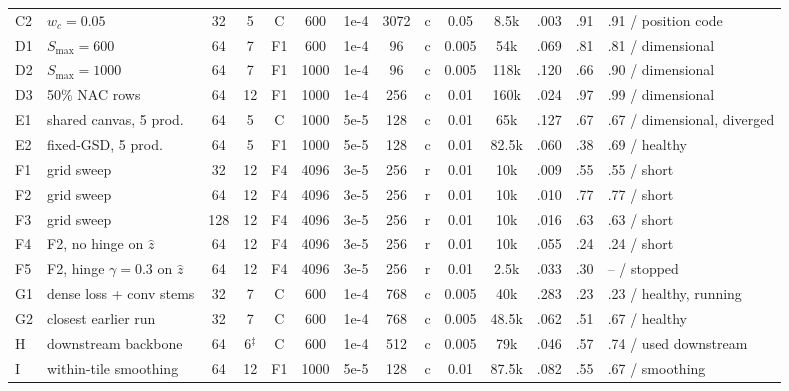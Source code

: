 \begin{table}[t]
\begin{tabular}{@{}llcccccccccccl@{}}
    C2 & $w_c{=}0.05$         & 32  & 5  & C  & 600  & 1e-4 & 3072 & c & 0.05  & 8.5k  & .003 & .91 & .91 / position code \\
    D1 & $S_{\max}{=}600$                               & 64  & 7  & F1 & 600  & 1e-4 & 96   & c & 0.005 & 54k   & .069 & .81 & .81 / dimensional \\
    D2 & $S_{\max}{=}1000$                                   & 64  & 7  & F1 & 1000 & 1e-4 & 96   & c & 0.005 & 118k  & .120 & .66 & .90 / dimensional \\
    D3 & 50\% NAC rows                                       & 64  & 12 & F1 & 1000 & 1e-4 & 256  & c & 0.01  & 160k  & .024 & .97 & .99 / dimensional \\
    E1 & shared canvas, 5 prod.                            & 64  & 5  & C  & 1000 & 5e-5 & 128  & c & 0.01  & 65k   & .127 & .67 & .67 / dimensional, diverged \\
    E2 & fixed-GSD, 5 prod.                                  & 64  & 5  & F1 & 1000 & 5e-5 & 128  & c & 0.01  & 82.5k & .060 & .38 & .69 / healthy \\
    F1 & grid sweep                                          & 32  & 12 & F4 & 4096 & 3e-5 & 256  & r & 0.01  & 10k   & .009 & .55 & .55 / short \\
    F2 & grid sweep                              & 64  & 12 & F4 & 4096 & 3e-5 & 256  & r & 0.01  & 10k   & .010 & .77 & .77 / short \\
    F3 & grid sweep                                          & 128 & 12 & F4 & 4096 & 3e-5 & 256  & r & 0.01  & 10k   & .016 & .63 & .63 / short \\
    F4 & F2, no hinge on $\hat z$               & 64  & 12 & F4 & 4096 & 3e-5 & 256  & r & 0.01  & 10k   & .055 & .24 & .24 / short \\
    F5 & F2, hinge $\gamma{=}0.3$ on $\hat z$  & 64  & 12 & F4 & 4096 & 3e-5 & 256  & r & 0.01  & 2.5k  & .033 & .30 & -- / stopped \\
    G1 & dense loss + conv stems                             & 32  & 7  & C  & 600  & 1e-4 & 768  & c & 0.005 & 40k   & .283 & .23 & .23 / healthy, running \\
    G2 & closest earlier run                                 & 32  & 7  & C  & 600  & 1e-4 & 768  & c & 0.005 & 48.5k & .062 & .51 & .67 / healthy \\
    H  & downstream backbone                                 & 64  & 6$^\ddagger$ & C & 600 & 1e-4 & 512 & c & 0.005 & 79k & .046 & .57 & .74 / used downstream \\
    I  & within-tile smoothing                               & 64  & 12 & F1 & 1000 & 5e-5 & 128  & c & 0.01  & 87.5k & .082 & .55 & .67 / smoothing \\
    \bottomrule
  \end{tabular}
\end{table}


